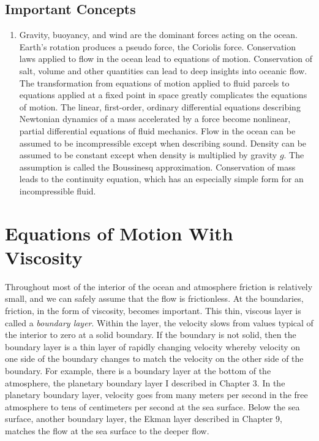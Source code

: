 \section{Important Concepts}
\begin{enumerate}
\item Gravity, buoyancy, and wind are the dominant forces acting on
the ocean.
\vitem Earth's rotation produces a pseudo force, the Coriolis force.
\vitem Conservation laws applied to flow in the ocean lead to equations of
motion. Conservation of salt, volume and other quantities can lead to
deep insights into oceanic flow.
\vitem The transformation from equations of motion applied to fluid parcels to
equations applied at a fixed point in space greatly complicates the
equations of motion. The linear, first-order, ordinary differential equations
describing Newtonian dynamics of a mass accelerated by a force become
nonlinear, partial differential equations of fluid mechanics.
\vitem Flow in the ocean can be assumed to be incompressible except when
describing sound. Density can be assumed to be constant except when density is
multiplied by gravity $g$. The assumption is called the Boussinesq
approximation.
\vitem Conservation of mass leads to the continuity equation, which has an
especially simple form for an incompressible fluid.
\end{enumerate}


\chapter{Equations of Motion With Viscosity}
Throughout most of the interior of the ocean and atmosphere friction is relatively
small, and we can safely assume that the flow is frictionless. At the boundaries,
friction, in the form of viscosity, becomes important. This thin, viscous layer is
called a \textit{boundary layer}. Within the layer,
the velocity slows from values typical of the interior to zero at a
solid boundary. If the boundary is not solid, then the boundary layer is a thin
layer of rapidly changing velocity whereby velocity on one side of the boundary
changes to match the velocity on the other side of the boundary. For example, there
is a boundary layer at the bottom of the atmosphere, the planetary boundary layer
I described in Chapter 3. In the planetary boundary layer, velocity goes from many
meters per second in the free atmosphere to tens of centimeters per second at the
sea surface. Below the sea surface, another boundary layer, the Ekman layer described in Chapter 9, matches the flow at the sea surface to the
deeper flow.

